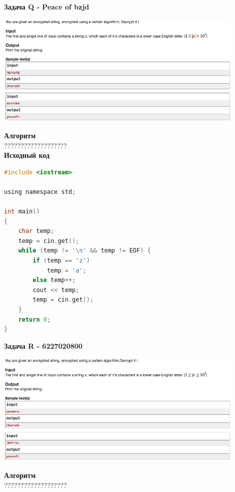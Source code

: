 \documentclass[a4paper,12pt]{article}
\begin{document}
\newpage
\textbf{{\large Задача Q - Peace of bzjd}} \\
\begin{center}
\includegraphics[width=0.9\textwidth]{CT_Crypto/CT_Crypto_Q.png}\\ [1cm]
\end{center}
\textbf{{\large Алгоритм}} \\
{\Huge ???????????????????} \\ 

\textbf{{\large Исходный код}}
\begin{lstlisting}[language=C]
#include <iostream>

using namespace std;

int main()
{
    char temp;
    temp = cin.get();
    while (temp != '\n' && temp != EOF) {
        if (temp == 'z') 
            temp = 'a';
        else temp++;
        cout << temp;
        temp = cin.get();
    }
    return 0;
}
\end{lstlisting}

\newpage
\textbf{{\large Задача R - 6227020800}} \\
\begin{center}
\includegraphics[width=0.9\textwidth]{CT_Crypto/CT_Crypto_R.png}\\ [1cm]
\end{center}
\textbf{{\large Алгоритм}} \\
{\Huge ???????????????????} \\ 
\end{document}

